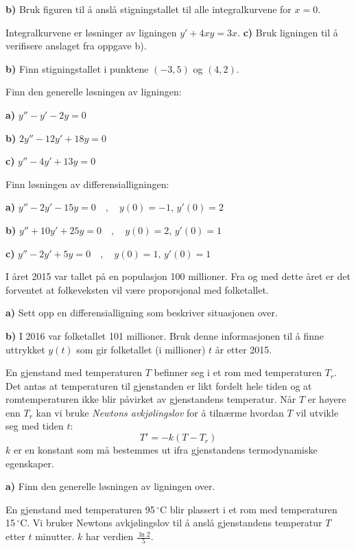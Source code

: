\textbf{b)} Bruk figuren til å anslå stigningstallet til alle integralkurvene for $ x=0 $.\vsk

Integralkurvene er løsninger av ligningen $ y' + 4x y = 3x$. 
\os
\textbf{c)} Bruk ligningen til å verifisere anslaget fra oppgave b).\os

\textbf{b)} Finn stigningstallet i punktene $ (-3, 5) $ og $ (4, 2) $.

\nes
{}
Finn den generelle løsningen av ligningen:\os

\textbf{a)} $ y''-y'-2y =0 $\os

\textbf{b)} $ 2y''-12y'+18y=0 $\os

\textbf{c)} $ y''-4y'+13y=0 $

Finn løsningen av differensialligningen:\os

\textbf{a)} $ y''-2y'-15y=0\quad,\quad y(0)=-1,\,y'(0)=2 $\os

\textbf{b)} $ y''+10y'+25y=0\quad,\quad y(0)=2,\,y'(0)=1  $\os

\textbf{c)} $ y''-2y'+5y=0\quad,\quad y(0)=1,\,y'(0)=1  $

\nes
{}
I året 2015 var tallet på en populasjon 100 millioner. Fra og med dette året er det forventet at folkeveksten vil være proporsjonal med folketallet.\os

\textbf{a)} Sett opp en differensialligning som beskriver situasjonen over.\os

\textbf{b)} I 2016 var folketallet 101 millioner. Bruk denne informasjonen til å finne uttrykket $ y(t) $ som gir folketallet (i millioner) $ t $ år etter 2015.

En gjenstand med temperaturen $ T$ befinner seg i et rom med temperaturen $ T_r $. Det antas at temperaturen til gjenstanden er likt fordelt hele tiden og at romtemperaturen ikke blir påvirket av gjenstandens temperatur. Når $ T$ er høyere enn $ T_r $ kan vi bruke \textit{Newtons avkjølingslov} for å tilnærme hvordan $ T $ vil utvikle seg med tiden $ t $:
\[ T'=-k(T-T_r) \]
$ k $ er en konstant som må bestemmes ut ifra gjenstandens termodynamiske egenskaper. \os

\textbf{a)} Finn den generelle løsningen av ligningen over.

En gjenstand med temperaturen 95\,$ ^\circ $C blir plassert i et rom med temperaturen 15\,$ ^\circ $C. Vi bruker Newtons avkjølingslov til å anslå gjenstandens temperatur $ T $ etter $ t $ minutter. $ k $ har verdien $ \frac{\ln 2}{5} $. \os

